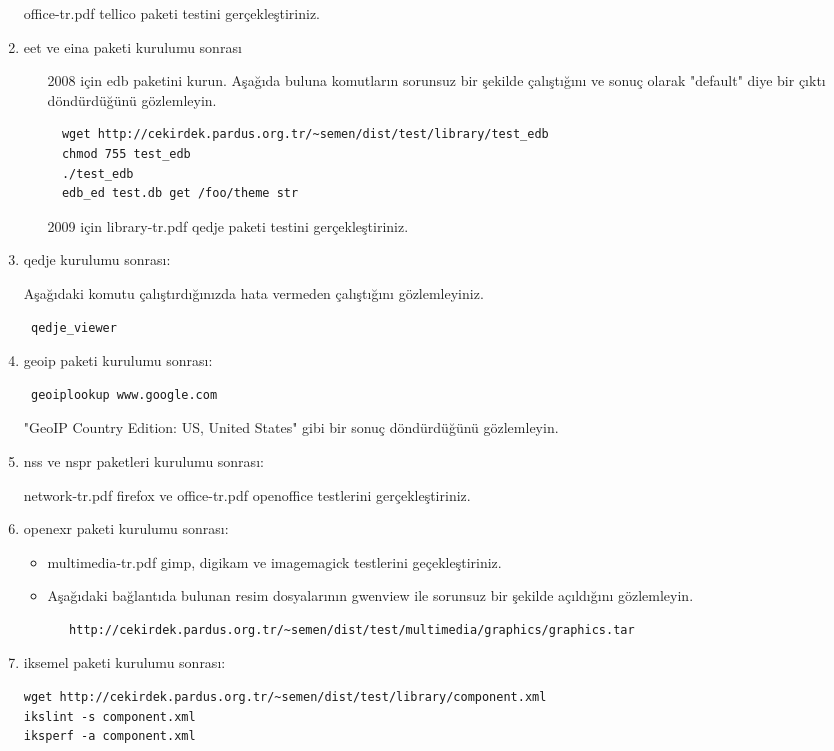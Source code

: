 \documentclass[a4paper,10pt]{article}
\begin{document}
\begin{enumerate}
office-tr.pdf tellico paketi testini gerçekleştiriniz.

\item eet ve eina paketi kurulumu sonrası
\begin{itemize}
 \item [2008 için] edb paketini kurun. Aşağıda buluna komutların sorunsuz bir şekilde çalıştığını ve sonuç olarak "default" diye bir çıktı döndürdüğünü gözlemleyin.
\begin{verbatim}
  wget http://cekirdek.pardus.org.tr/~semen/dist/test/library/test_edb
  chmod 755 test_edb
  ./test_edb
  edb_ed test.db get /foo/theme str
\end{verbatim}
\item [2009 için] library-tr.pdf qedje paketi testini gerçekleştiriniz.
\end{itemize}

\item qedje kurulumu sonrası:

Aşağıdaki komutu çalıştırdığınızda hata vermeden çalıştığını gözlemleyiniz.
\begin{verbatim}
 qedje_viewer
\end{verbatim}

\item geoip paketi kurulumu sonrası:
\begin{verbatim}
 geoiplookup www.google.com 
\end{verbatim}
"GeoIP Country Edition: US, United States" gibi bir sonuç döndürdüğünü gözlemleyin.

\item nss ve nspr paketleri kurulumu sonrası:

network-tr.pdf firefox ve office-tr.pdf openoffice testlerini gerçekleştiriniz.

\item openexr paketi kurulumu sonrası:
\begin{itemize}
 \item multimedia-tr.pdf gimp, digikam ve imagemagick testlerini geçekleştiriniz.
 \item Aşağıdaki bağlantıda bulunan resim dosyalarının gwenview ile sorunsuz bir şekilde açıldığını gözlemleyin.
  \begin{verbatim}
   http://cekirdek.pardus.org.tr/~semen/dist/test/multimedia/graphics/graphics.tar
  \end{verbatim}
\end{itemize}
\item iksemel paketi kurulumu sonrası:
\begin{verbatim}
wget http://cekirdek.pardus.org.tr/~semen/dist/test/library/component.xml
ikslint -s component.xml
iksperf -a component.xml 
\end{verbatim}


\end{enumerate}
\end{document}
